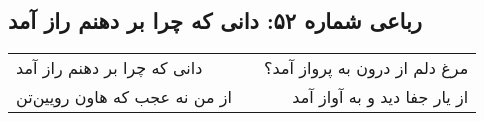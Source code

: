 \begin{center}
\section*{رباعی شماره ۵۲: دانی که چرا بر دهنم راز آمد}
\label{sec:052}
\begin{longtable}{l p{0.5cm} r}
دانی که چرا بر دهنم راز آمد
&&
مرغ دلم از درون به پرواز آمد؟
\\
از من نه عجب که هاون رویین‌تن
&&
از یار جفا دید و به آواز آمد
\\
\end{longtable}
\end{center}

